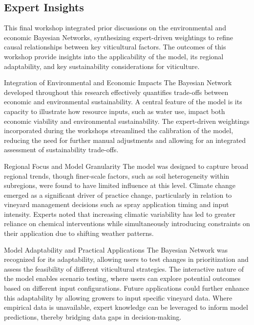 \documentclass{article}
\begin{document}
\subsection{Expert Insights}

This final workshop integrated prior discussions on the environmental and economic Bayesian Networks, synthesizing expert-driven weightings to refine causal relationships between key viticultural factors. The outcomes of this workshop provide insights into the applicability of the model, its regional adaptability, and key sustainability considerations for viticulture.

Integration of Environmental and Economic Impacts
The Bayesian Network developed throughout this research effectively quantifies trade-offs between economic and environmental sustainability. A central feature of the model is its capacity to illustrate how resource inputs, such as water use, impact both economic viability and environmental sustainability. The expert-driven weightings incorporated during the workshops streamlined the calibration of the model, reducing the need for further manual adjustments and allowing for an integrated assessment of sustainability trade-offs.

Regional Focus and Model Granularity
The model was designed to capture broad regional trends, though finer-scale factors, such as soil heterogeneity within subregions, were found to have limited influence at this level. Climate change emerged as a significant driver of practice change, particularly in relation to vineyard management decisions such as spray application timing and input intensity. Experts noted that increasing climatic variability has led to greater reliance on chemical interventions while simultaneously introducing constraints on their application due to shifting weather patterns.

Model Adaptability and Practical Applications
The Bayesian Network was recognized for its adaptability, allowing users to test changes in prioritization and assess the feasibility of different viticultural strategies. The interactive nature of the model enables scenario testing, where users can explore potential outcomes based on different input configurations. Future applications could further enhance this adaptability by allowing growers to input specific vineyard data. Where empirical data is unavailable, expert knowledge can be leveraged to inform model predictions, thereby bridging data gaps in decision-making.
\end{document}
